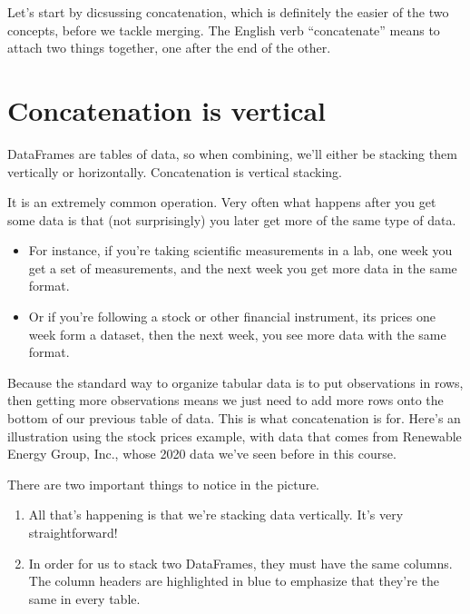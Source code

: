 \documentclass[letterpaper,10pt,english]{sphinxmanual}
\begin{document}
Let’s start by dicsussing concatenation, which is definitely the easier of the two concepts, before we tackle merging.  The English verb “concatenate” means to attach two things together, one after the end of the other.


\section{Concatenation is vertical}
\label{\detokenize{chapter-12-concat-and-merge:concatenation-is-vertical}}
DataFrames are tables of data, so when combining, we’ll either be stacking them vertically or horizontally.  Concatenation is vertical stacking.

It is an extremely common operation.  Very often what happens after you get some data is that (not surprisingly) you later get more of the same type of data.
\begin{itemize}
\item {} 
For instance, if you’re taking scientific measurements in a lab, one week you get a set of measurements, and the next week you get more data in the same format.

\item {} 
Or if you’re following a stock or other financial instrument, its prices one week form a dataset, then the next week, you see more data with the same format.

\end{itemize}

Because the standard way to organize tabular data is to put observations in rows, then getting more observations means we just need to add more rows onto the bottom of our previous table of data.  This is what concatenation is for.  Here’s an illustration using the stock prices example, with data that comes from Renewable Energy Group, Inc., whose 2020 data we’ve seen before in this course.


There are two important things to notice in the picture.
\begin{enumerate}
%
\item {} 
All that’s happening is that we’re stacking data vertically.  It’s very straightforward!

\item {} 
In order for us to stack two DataFrames, they must have the same columns.  The column headers are highlighted in blue to emphasize that they’re the same in every table.

\end{enumerate}
\end{document}
